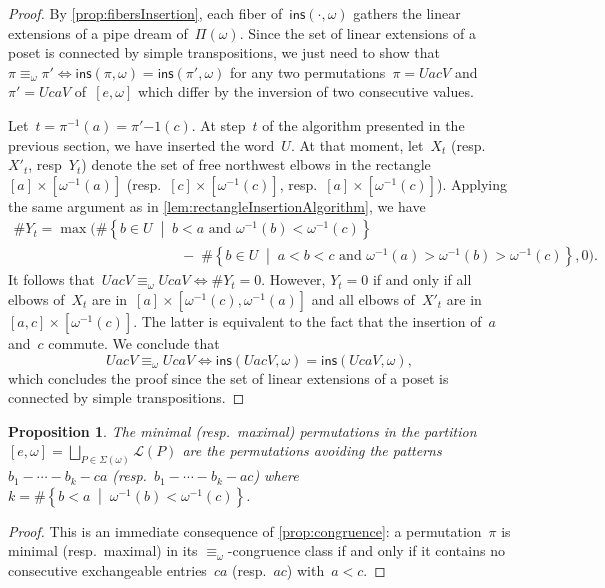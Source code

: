 \documentclass{amsart}
\newtheorem{proposition}[theorem]{Proposition}
\theoremstyle{definition}
\newcommand{\set}[2]{\left\{ #1 \;\middle|\; #2 \right\}} %
\newcommand{\pipeDreams}{\Pi} %
\newcommand{\insertion}[2]{\mathsf{ins}(#1,#2)} %
\newcommand{\acyclicPipeDreams}{\Sigma} %
\newcommand{\linearExtensions}{\mathcal{L}} %
\begin{document}
\begin{proof}
By \cref{prop:fibersInsertion}, each fiber of~$\insertion{\cdot}{\omega}$ gathers the linear extensions of a pipe dream of~$\pipeDreams(\omega)$.
Since the set of linear extensions of a poset is connected by simple transpositions, we just need to show that~$\pi \equiv_\omega \pi' \!\iff\! \insertion{\pi}{\omega} = \insertion{\pi'}{\omega}$ for any two permutations~$\pi = UacV$ and~$\pi' = UcaV$ of~$[e,\omega]$ which differ by the inversion of two consecutive values.

Let~$t = \pi^{-1}(a) = \pi'{-1}(c)$.
At step~$t$ of the algorithm presented in the previous section, we have inserted the word~$U$.
At that moment, let~$X_t$ (resp.~$X'_t$, resp~$Y_t$) denote the set of free northwest elbows in the rectangle~$[a] \times [\omega^{-1}(a)]$ (resp.~$[c] \times [\omega^{-1}(c)]$, resp.~$[a] \times [\omega^{-1}(c)]$).
Applying the same argument as in \cref{lem:rectangleInsertionAlgorithm}, we have
\begin{gather*}
\# Y_t = \max\big( \#\set{b \in U}{b < a \text{ and } \omega^{-1}(b) < \omega^{-1}(c)} \hspace{5cm} \\ \hspace{5cm} - \; \#\set{b \in U}{a < b < c \text{ and } \omega^{-1}(a) > \omega^{-1}(b) > \omega^{-1}(c)}, 0\big).
\end{gather*}
It follows that~$U ac V \equiv_\omega U ca V \iff \# Y_t = 0$.
However, $Y_t = 0$ if and only if all elbows of~$X_t$ are in~$[a] \times [\omega^{-1}(c), \omega^{-1}(a)]$ and all elbows of~$X'_t$ are in~$[a,c] \times [\omega^{-1}(c)]$.
The latter is equivalent to the fact that the insertion of~$a$ and~$c$ commute.
We conclude that
\[
U ac V \equiv_\omega U ca V \iff \insertion{UacV}{\omega} = \insertion{UcaV}{\omega},
\]
which concludes the proof since the set of linear extensions of a poset is connected by simple transpositions.
\end{proof}

\begin{proposition}
\label{prop:patternAvoiding}
The minimal (resp.~maximal) permutations in the partition
\(
{[e,\omega] = \bigsqcup_{P \in \acyclicPipeDreams(\omega)} \linearExtensions(P)}
\)
are the permutations avoiding the patterns~$b_1 - \cdots - b_k - ca$ (resp.~$b_1 - \cdots - b_k - ac$) where $k = \#\set{b < a}{\omega^{-1}(b) < \omega^{-1}(c)}$.
\end{proposition}

\begin{proof}
This is an immediate consequence of \cref{prop:congruence}: a permutation~$\pi$ is minimal (resp.~maximal) in its $\equiv_\omega$-congruence class if and only if it contains no consecutive exchangeable entries~$ca$ (resp.~$ac$) with~$a < c$.
\end{proof}
\end{document}
